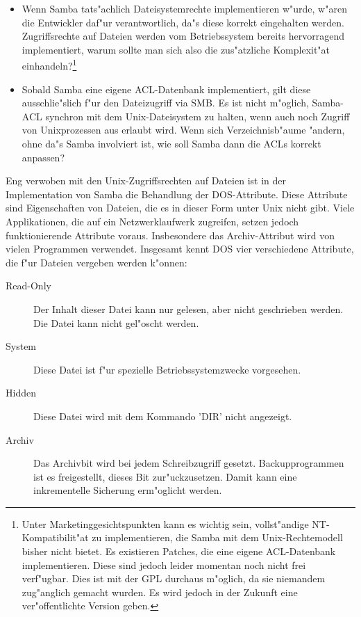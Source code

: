\documentclass{scrartcl}\usepackage{pslatex}\typearea{12}
\begin{document}
\begin{itemize}
\item Wenn Samba tats"achlich Dateisystemrechte implementieren w"urde,
  w"aren die Entwickler daf"ur verantwortlich, da"s diese korrekt
  eingehalten werden. Zugriffsrechte auf Dateien werden vom
  Betriebssystem bereits hervorragend implementiert, warum sollte man
  sich also die zus"atzliche Komplexit"at einhandeln?\footnote{Unter
    Marketinggesichtspunkten kann es wichtig sein, vollst"andige
    NT-Kompatibilit"at zu implementieren, die Samba mit dem
    Unix-Rechtemodell bisher nicht bietet. Es existieren Patches, die
    eine eigene ACL-Datenbank implementieren. Diese sind jedoch leider
    momentan noch nicht frei verf"ugbar. Dies ist mit der GPL durchaus
    m"oglich, da sie niemandem zug"anglich gemacht wurden. Es wird
    jedoch in der Zukunft eine ver"offentlichte Version geben.}
\item Sobald Samba eine eigene ACL-Datenbank implementiert, gilt diese
  ausschlie"slich f"ur den Dateizugriff via SMB. Es ist nicht
  m"oglich, Samba-ACL synchron mit dem Unix-Dateisystem zu halten,
  wenn auch noch Zugriff von Unixprozessen aus erlaubt wird. Wenn sich
  Verzeichnisb"aume "andern, ohne da"s Samba involviert ist, wie soll
  Samba dann die ACLs korrekt anpassen?
\end{itemize}

Eng verwoben mit den Unix-Zugriffsrechten auf Dateien ist in der
Implementation von Samba die Behandlung der DOS-Attribute. Diese
Attribute sind Eigenschaften von Dateien, die es in dieser Form unter
Unix nicht gibt. Viele Applikationen, die auf ein Netzwerklaufwerk
zugreifen, setzen jedoch funktionierende Attribute voraus.
Insbesondere das Archiv-Attribut wird von vielen Programmen verwendet.
Insgesamt kennt DOS vier verschiedene Attribute, die f"ur Dateien
vergeben werden k"onnen:

\begin{description}
\item[Read-Only] Der Inhalt dieser Datei kann nur gelesen, aber nicht
  geschrieben werden. Die Datei kann nicht gel"oscht werden.
\item[System] Diese Datei ist f"ur spezielle Betriebssystemzwecke
  vorgesehen.
\item[Hidden] Diese Datei wird mit dem Kommando 'DIR' nicht angezeigt.
\item[Archiv] Das Archivbit wird bei jedem Schreibzugriff gesetzt.
  Backupprogrammen ist es freigestellt, dieses Bit zur"uckzusetzen.
  Damit kann eine inkrementelle Sicherung erm"oglicht werden.
\end{description}
\end{document}
